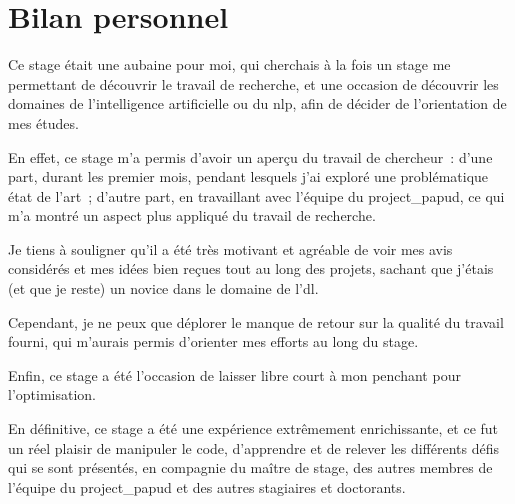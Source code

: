 \section{Bilan personnel}
Ce stage était une aubaine pour moi, qui cherchais à la fois un stage me permettant de découvrir le travail de recherche, et une occasion de découvrir les domaines de l'intelligence artificielle ou du \gls{nlp}, afin de décider de l'orientation de mes études.

En effet, ce stage m'a permis d'avoir un aperçu du travail de chercheur~:
d'une part, durant les premier mois, pendant lesquels j'ai exploré une problématique état de l'art~; d'autre part, en travaillant avec l'équipe du \gls{project_papud}, ce qui m'a montré un aspect plus appliqué du travail de recherche.

Je tiens à souligner qu'il a été très motivant et agréable de voir mes avis considérés et mes idées bien reçues tout au long des projets, sachant que j'étais (et que je reste) un novice dans le domaine de l'\gls{dl}.

Cependant, je ne peux que déplorer le manque de retour sur la qualité du travail fourni, qui m'aurais permis d'orienter mes efforts au long du stage.

Enfin, ce stage a été l'occasion de laisser libre court à mon penchant pour l'optimisation.

En définitive, ce stage a été une expérience extrêmement enrichissante, et ce fut un réel plaisir de manipuler le code, d'apprendre et de relever les différents défis qui se sont présentés, en compagnie du maître de stage, des autres membres de l'équipe du \gls{project_papud} et des autres stagiaires et doctorants.









